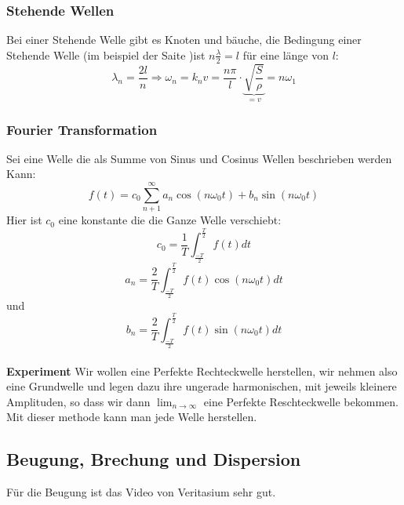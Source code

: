 \documentclass{article}
\newcommand{\experiment}{\\[2ex]\textbf{Experiment }}
\begin{document}
\subsubsection{Stehende Wellen} Bei einer Stehende Welle gibt es Knoten und bäuche, die Bedingung einer Stehende Welle (im beispiel der Saite )ist $n\frac{\lambda}{2}=l$ für eine länge von $l$:\[\lambda_n=\frac{2l}{n}\Rightarrow\omega_n=k_nv= \frac{n\pi}{l}\cdot\underset{=v}{\underbrace{\sqrt{\frac{S}{\rho}}}}=n\omega_1\]
\subsubsection{Fourier Transformation}
Sei eine Welle die als Summe von Sinus und Cosinus Wellen beschrieben werden Kann:
\[f(t)=c_0\sum_{n+1}^\infty a_n \cos(n\omega_0 t)+b_n\sin(n\omega_0t)\]
Hier ist $c_0$ eine konstante die die Ganze Welle verschiebt: \[c_0=\frac{1}{T}\int_{\frac{-T}{2}}^{\frac{T}{2}}f(t)dt\] 
\[a_n=\frac{2}{T}\int_{\frac{-T}{2}}^{\frac{T}{2}} f(t)\cos(n\omega_0t)dt\] und 
\[b_n=\frac{2}{T}\int_{\frac{-T}{2}}^{\frac{T}{2}} f(t)\sin(n\omega_0t)dt\]
\experiment
Wir wollen eine Perfekte Rechteckwelle herstellen, wir nehmen also eine Grundwelle und legen dazu ihre ungerade harmonischen, mit jeweils kleinere Amplituden, so dass wir dann $\lim_{n\rightarrow \infty}$ eine Perfekte Reschteckwelle bekommen. Mit dieser methode kann man jede Welle herstellen.
\newline
\subsection{Beugung, Brechung und Dispersion}
Für die Beugung ist das Video von Veritasium sehr gut.\newline
\end{document}

